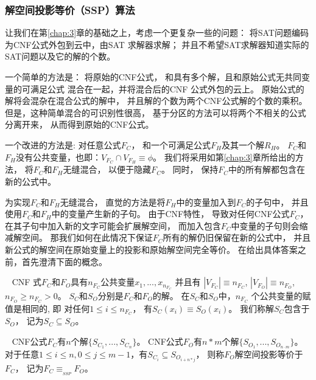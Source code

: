 \subsubsection{解空间投影等价（SSP）算法}\label{4:embeded rules}

让我们在第\ref{chap:3}章的基础之上，考虑一个更复杂一些的问题：
将SAT问题编码为CNF公式外包到云中，由SAT 求解器求解；
并且不希望SAT求解器知道实际的SAT问题以及它的解的个数。

一个简单的方法是：
将原始的CNF公式，
和具有多个解，且和原始公式无共同变量的可满足公式
混合在一起，并将混合后的CNF 公式外包的云上。
原始公式的解将会混杂在混合公式的解中，
并且解的个数为两个CNF公式解的个数的乘积。
但是，这种简单混合的可识别性很高，
基于分区的方法可以将两个不相关的公式分离开来，
从而得到原始的CNF公式。

一个改进的方法是:
对任意公式$F_C$，
和一个可满足公式$F_H$及其一个解$R_H$。
$F_C$和$F_H$没有公共变量，也即：$V_{F_C}\cap V_{F_H}\equiv \phi$。
我们将采用如第\ref{chap:3}章所给出的方法，
将$F_C$和$F_H$无缝混合，
以便于隐藏$F_C$。
同时，
保持$F_C$中的所有解都包含在新的公式中。

为实现$F_C$和$F_H$无缝混合，
直觉的方法是将$F_H$中的变量加入到$F_C$的子句中，
并且使用$F_C$和$F_H$中的变量产生新的子句。
由于CNF特性，
导致对任何CNF公式$F_C$，
在其子句中加入新的文字可能会扩展解空间，
而加入包含$F_C$中变量的子句则会缩减解空间。
那我们如何在此情况下保证$F_C$所有的解仍旧保留在新的公式中，
并且新公式的解空间在原始变量上的投影和原始解空间完全等价。
在给出具体答案之前，首先澄清下面的概念。

\begin{definition}~
CNF 式$F_C$和$F_O$具有$n_{F_C}$公共变量$x_1,...,x_{n_{F_C}}$ 并且有
$|V_{F_C}|\equiv n_{F_C}$, $|V_{F_O}|\equiv n_{F_O}$, $ n_{F_O}\geqslant n_{F_C} > 0$。
$S_C$和$S_O$分别是$F_C$和$F_O$的解。
在$S_C$和$S_O$中，$n_{F_C}$ 个公共变量的赋值是相同的, 即
对任何$1\le i\le n_{F_C}$，
有$S_C(x_i)\equiv S_O(x_i)$。
我们称解$S_C$包含于$S_O$，
记为$S_C\subseteq S_O$。
\end{definition}


\begin{definition}\label{4:SSPdefinition}~
CNF公式$F_C$有$n$个解$\{S_{C_1},...,S_{C_n}\}$。
CNF公式$F_O$有$n * m$个解$\{S_{O_1},...,S_{O_{n \cdot m}}\}$。
对于任意$1\le i\le n,0\le j\le m-1$，有$S_{C_i} \subseteq S_{O_{i + {n * j}}}$，
则称$F_O$解空间投影等价于$F_C$，
记为$F_C \equiv_{_{SSP}} F_O$。
\end{definition}

